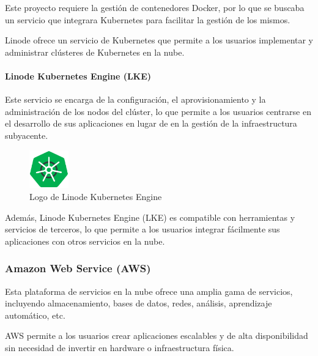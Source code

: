                 Este proyecto requiere la gestión de contenedores Docker, por lo que se buscaba un servicio que integrara Kubernetes para facilitar la gestión de los mismos.
                
                Linode ofrece un servicio de Kubernetes que permite a los usuarios implementar y administrar clústeres de Kubernetes en la nube.

                \paragraph{Linode Kubernetes Engine (LKE)}

                    Este servicio se encarga de la configuración, el aprovisionamiento y la administración de los nodos del clúster, lo que permite a los usuarios centrarse en el desarrollo de sus aplicaciones en lugar de en la gestión de la infraestructura subyacente.
                    
                    \begin{figure}[htbp]
                        \centering
    
                        \includegraphics[width=0.15\textwidth]{images/Logos/lke.png}
                        \caption{Logo de Linode Kubernetes Engine}
    
                        \label{fig:lke-logo}
                    \end{figure}
                    
                    Además, Linode Kubernetes Engine (LKE) es compatible con herramientas y servicios de terceros, lo que permite a los usuarios integrar fácilmente sus aplicaciones con otros servicios en la nube.

            \subsubsection{Amazon Web Service (AWS)}
                \label{sec:aws}

                Esta plataforma de servicios en la nube ofrece una amplia gama de servicios, incluyendo almacenamiento, bases de datos, redes, análisis, aprendizaje automático, etc.
                
                AWS permite a los usuarios crear aplicaciones escalables y de alta disponibilidad sin necesidad de invertir en hardware o infraestructura física.

